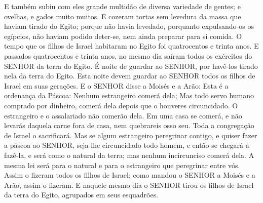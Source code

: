 {E também subiu com eles grande multidão de diversa variedade de gentes; e ovelhas, e gados muito muitos.
E cozeram tortas sem levedura da massa que haviam tirado do Egito; porque não havia levedado, porquanto expulsando-os os egípcios, não haviam podido deter-se, nem ainda preparar para si comida.
O tempo que os filhos de Israel habitaram no Egito foi quatrocentos e trinta anos.
E passados quatrocentos e trinta anos, no mesmo dia saíram todos os exércitos do SENHOR da terra do Egito.
É noite de guardar ao SENHOR, por havê-los tirado nela da terra do Egito. Esta noite devem guardar ao SENHOR todos os filhos de Israel em suas gerações.
E o SENHOR disse a Moisés e a Arão: Esta é a ordenança da Páscoa: Nenhum estrangeiro comerá dela;
Mas todo servo humano comprado por dinheiro, comerá dela depois que o houveres circuncidado.
O estrangeiro e o assalariado não comerão dela.
Em uma casa se comerá, e não levarás daquela carne fora de casa, nem quebrareis osso seu.
Toda a congregação de Israel o sacrificará.
Mas se algum estrangeiro peregrinar contigo, e quiser fazer a páscoa ao SENHOR, seja-lhe circuncidado todo homem, e então se chegará a fazê-la, e será como o natural da terra; mas nenhum incircunciso comerá dela.
A mesma lei será para o natural e para o estrangeiro que peregrinar entre vós.
Assim o fizeram todos os filhos de Israel; como mandou o SENHOR a Moisés e a Arão, assim o fizeram.
E naquele mesmo dia o SENHOR tirou os filhos de Israel da terra do Egito, agrupados em seus esquadrões.

}
